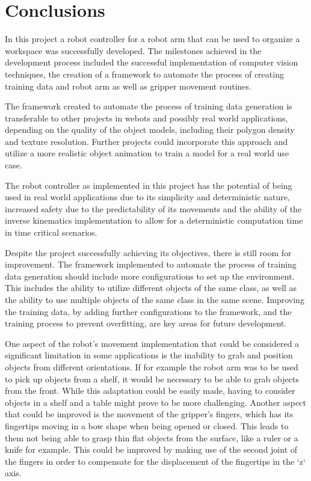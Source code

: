 
\chapter{Conclusions} %

\label{conclusions} %


In this project a robot controller for a robot arm that can be used to organize a workspace was successfully developed. The milestones achieved in the development process included the successful implementation of computer vision techniques, the creation of a framework to automate the process of creating training data and robot arm as well as gripper movement routines.

The framework created to automate the process of training data generation is transferable to other projects in webots and possibly real world applications, depending on the quality of the object models, including their polygon density and texture resolution. Further projects could incorporate this approach and utilize a more realistic object animation to train a model for a real world use case. 

The robot controller as implemented in this project has the potential of being used in real world applications due to its simplicity and deterministic nature, increased safety due to the predictability of its movements and the ability of the inverse kinematics implementation to allow for a deterministic computation time in time critical scenarios.

Despite the project successfully achieving its objectives, there is still room for improvement. The framework implemented to automate the process of training data generation should include more configurations to set up the environment. This includes the ability to utilize different objects of the same class, as well as the ability to use multiple objects of the same class in the same scene. Improving the training data, by adding further configurations to the framework, and the training process to prevent overfitting, are key areas for future development.

One aspect of the robot's movement implementation that could be considered a significant limitation in some applications is the inability to grab and position objects from different orientations. If for example the robot arm was to be used to pick up objects from a shelf, it would be necessary to be able to grab objects from the front. While this adaptation could be easily made, having to consider objects in a shelf and a table might prove to be more challenging. 
Another aspect that could be improved is the movement of the gripper's fingers, which has its fingertips moving in a bow shape when being opened or closed. This leads to them not being able to grasp thin flat objects from the surface, like a ruler or a knife for example. This could be improved by making use of the second joint of the fingers in order to compensate for the displacement of the fingertips in the `z` axis.


